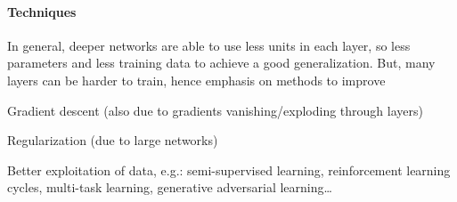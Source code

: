\documentclass[10pt]{report}
\begin{document}
\paragraph{Techniques} In general, deeper networks are able to use less units in each layer, so less parameters and less training data to achieve a good generalization. But, many layers can be harder to train, hence emphasis on methods to improve
\begin{list}{}{}
	\item Gradient descent (also due to gradients vanishing/exploding through layers)
	\item Regularization (due to large networks)
	\item Better exploitation of data, e.g.: semi-supervised learning, reinforcement learning cycles, multi-task learning, generative adversarial learning\ldots
\end{list}
\end{document}
